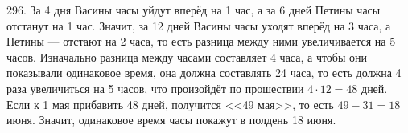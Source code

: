 296. За 4 дня Васины часы уйдут вперёд на 1 час, а за 6 дней Петины часы отстанут на 1 час. Значит, за 12 дней Васины часы уходят вперёд на 3 часа, а Петины --- отстают на 2 часа, то есть разница между ними увеличивается на 5 часов. Изначально разница между часами составляет 4 часа, а чтобы они показывали одинаковое время, она должна составлять 24 часа, то есть должна 4 раза увеличиться на 5 часов, что произойдёт по прошествии $4\cdot12=48$ дней. Если к 1 мая прибавить 48 дней, получится <<49 мая>>, то есть $49-31=18$ июня. Значит, одинаковое время часы покажут в полдень 18 июня.\\
